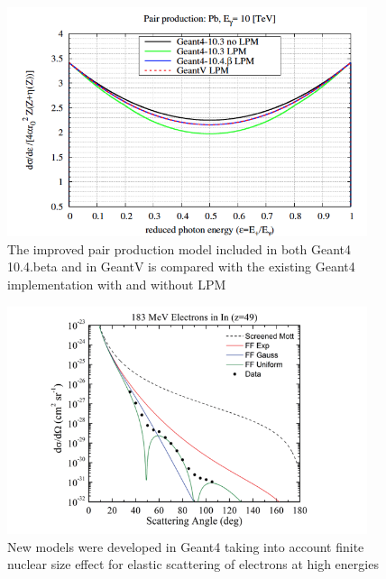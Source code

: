 \documentclass[12pt,a4paper]{article}
\begin{document}
\begin{figure}[bthp]
\centering
\includegraphics[width=0.94\textwidth]{image7.png}
\caption{The improved pair production model included in both
Geant4 10.4.beta and in GeantV is compared with the existing Geant4
implementation with and without LPM}
\label{fig:ppm}
\end{figure}

\begin{figure}[bthp]
\centering
\includegraphics[width=0.94\textwidth]{image8.png}
\caption{New models were developed in Geant4 taking into account
finite nuclear size effect for elastic scattering of electrons at high
energies}
\label{fig:newm}
\end{figure}
\end{document}
